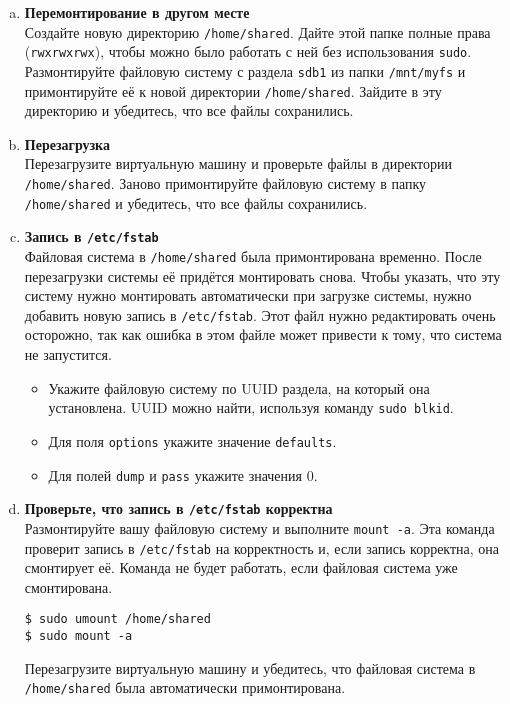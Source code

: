 \documentclass{article}
\begin{document}
\begin{enumerate}[a.]
\item \textbf{Перемонтирование в другом месте}\\
Создайте новую директорию \texttt{/home/shared}. Дайте этой папке полные права (\texttt{rwxrwxrwx}), чтобы можно было работать с ней без использования \texttt{sudo}.  Размонтируйте файловую систему с раздела \texttt{sdb1} из папки \texttt{/mnt/myfs} и примонтируйте её к новой директории \texttt{/home/shared}. Зайдите в эту директорию и убедитесь, что все файлы сохранились. 

\item \textbf{Перезагрузка}\\
Перезагрузите виртуальную машину и проверьте файлы в директории \texttt{/home/shared}.
Заново примонтируйте файловую систему в папку \texttt{/home/shared} и убедитесь, что все файлы сохранились.

\item \textbf{Запись в \texttt{/etc/fstab}}\\
Файловая система в \texttt{/home/shared} была примонтирована временно. После перезагрузки системы её придётся монтировать снова. Чтобы указать, что эту систему нужно монтировать автоматически при загрузке системы, нужно добавить новую запись в \texttt{/etc/fstab}. Этот файл нужно редактировать очень осторожно, так как ошибка в этом файле может привести к тому, что система не запустится.
\begin{itemize}
\item Укажите файловую систему по UUID раздела, на который она установлена. UUID можно найти, используя команду \texttt{sudo blkid}.
\item Для поля \texttt{options} укажите значение \texttt{defaults}.
\item Для полей \texttt{dump} и \texttt{pass} укажите значения 0.
\end{itemize}

\item \textbf{Проверьте, что запись в \texttt{/etc/fstab} корректна}\\
Размонтируйте вашу файловую систему и выполните \texttt{mount -a}. Эта команда проверит запись в \texttt{/etc/fstab} на корректность и, если запись корректна, она смонтирует её. Команда не будет работать, если файловая система уже смонтирована.
\begin{lstlisting}
$ sudo umount /home/shared
$ sudo mount -a
\end{lstlisting}
Перезагрузите виртуальную машину и убедитесь, что файловая система в \texttt{/home/shared} была автоматически примонтирована.

\end{enumerate}
\end{document}
